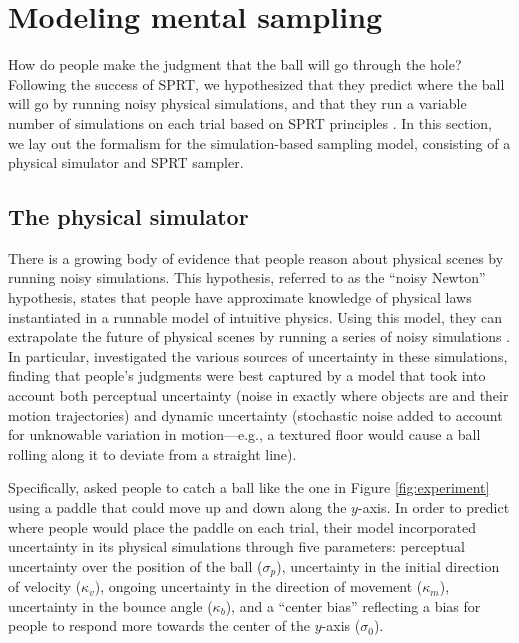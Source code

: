 \documentclass[10pt,letterpaper]{article}
\begin{document}
\section{Modeling mental sampling}

How do people make the judgment that the ball will go through the hole? Following the success of SPRT, we hypothesized that they predict where the ball will go by running noisy physical simulations, and that they run a variable number of simulations on each trial based on SPRT principles \cite{wald1947sequential}. In this section, we lay out the formalism for the simulation-based sampling model, consisting of a physical simulator and SPRT sampler.

\subsection{The physical simulator}

There is a growing body of evidence that people reason about physical scenes by running noisy simulations. This hypothesis, referred to as the ``noisy Newton'' hypothesis, states that people have approximate knowledge of physical laws instantiated in a runnable model of intuitive physics. Using this model, they can extrapolate the future of physical scenes by running a series of noisy simulations \cite{Smith:2013fc,Battaglia2013,Smith:2013ug,Smith:2013th,Smith:2014tx,Ullman:2014ut,Hamrick:2015}. In particular,  investigated the various sources of uncertainty in these simulations, finding that people's judgments were best captured by a model that took into account both perceptual uncertainty (noise in exactly where objects are and their motion trajectories) and dynamic uncertainty (stochastic noise added to account for unknowable variation in motion---e.g., a textured floor would cause a ball rolling along it to deviate from a straight line).

Specifically,  asked people to catch a ball like the one in Figure \ref{fig:experiment} using a paddle that could move up and down along the $y$-axis. In order to predict where people would place the paddle on each trial, their model incorporated uncertainty in its physical simulations through five parameters: perceptual uncertainty over the position of the ball ($\sigma_p$), uncertainty in the initial direction of velocity ($\kappa_v$), ongoing uncertainty in the direction of movement ($\kappa_m$), uncertainty in the bounce angle ($\kappa_b$), and a ``center bias'' reflecting a bias for people to respond more towards the center of the $y$-axis ($\sigma_0$).
\end{document}
